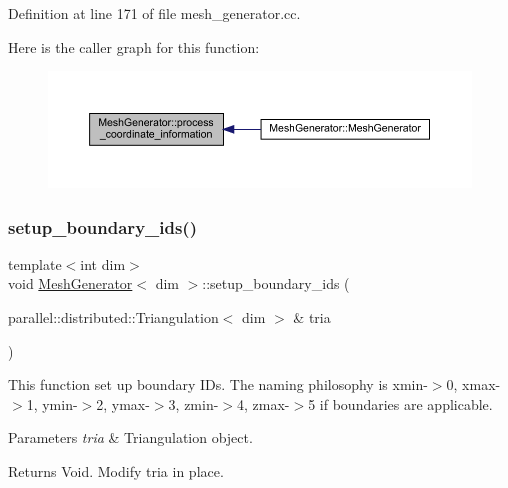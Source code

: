 Definition at line 171 of file mesh\+\_\+generator.\+cc.

Here is the caller graph for this function\+:\nopagebreak
\begin{figure}[H]
\begin{center}
\leavevmode
\includegraphics[width=350pt]{class_mesh_generator_a253330ef901e2a915576f6d6cd4262b5_icgraph}
\end{center}
\end{figure}
\mbox{\label{class_mesh_generator_a661d4e5efeb3ee94cc70c5da8e94a0ee}} 
\subsubsection{\texorpdfstring{setup\+\_\+boundary\+\_\+ids()}{setup\_boundary\_ids()}}
{\footnotesize\ttfamily template$<$int dim$>$ \\
void \hyperlink{class_mesh_generator}{Mesh\+Generator}$<$ dim $>$\+::setup\+\_\+boundary\+\_\+ids (\begin{DoxyParamCaption}\item[{parallel\+::distributed\+::\+Triangulation$<$ dim $>$ \&}]{tria }\end{DoxyParamCaption})\hspace{0.3cm}{\ttfamily [private]}}

This function set up boundary I\+Ds. The naming philosophy is xmin-\/$>$0, xmax-\/$>$1, ymin-\/$>$2, ymax-\/$>$3, zmin-\/$>$4, zmax-\/$>$5 if boundaries are applicable.


\begin{DoxyParams}{Parameters}
{\em tria} & Triangulation object. \\
\hline
\end{DoxyParams}
\begin{DoxyReturn}{Returns}
Void. Modify tria in place. 
\end{DoxyReturn}


